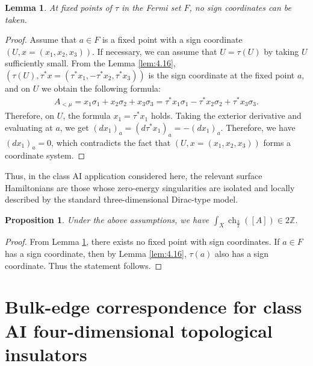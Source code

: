 \documentclass{amsart}
\newtheorem{prop}[thm]{Proposition}
\newtheorem{lem}[thm]{Lemma}
\theoremstyle{definition}
\theoremstyle{remark}
\begin{document}
\begin{lem}\label{lem:4.17}
At fixed points of $\tau$ in the Fermi set $F$, no sign coordinates can be taken.
\end{lem}

\begin{proof}
Assume that $a \in F$ is a fixed point with a sign coordinate $(U, x=(x_1, x_2, x_3))$. If necessary, we can assume that $U=\tau(U)$ by taking $U$ sufficiently small.
From the Lemma \ref{lem:4.16}, $(\tau(U), \tau^{*}x=(\tau^{*}x_1, -\tau^{*}x_2, \tau^{*}x_3))$ is the sign coordinate at the fixed point $a$, and on $U$ we obtain the following formula:
\begin{align*}
A_{<\mu}=x_1\sigma_1+x_2\sigma_2+x_3\sigma_3=\tau^{*}x_1\sigma_1-\tau^{*}x_2\sigma_2+\tau^{*}x_3\sigma_3.
\end{align*}
Therefore, on $U$, the formula $x_1=\tau^{*}x_1$ holds. Taking the exterior derivative and evaluating at $a$, we get $(dx_1)_a=(d\tau^{*}x_1)_a=-(dx_1)_a$. Therefore, we have $(dx_1)_a=0$, which contradicts the fact that $(U, x=(x_1, x_2, x_3))$ forms a coordinate system.
\end{proof}

Thus, in the class AI application considered here, the relevant surface Hamiltonians are those whose zero-energy singularities are isolated and locally described by the standard three-dimensional Dirac-type model.

\begin{prop}\label{prop:evenness}
Under the above assumptions, we have $\int_{X} \operatorname{ch}_{\frac{3}{2}}([A]) \in 2\mathbb{Z}$.
\end{prop}

\begin{proof}
From Lemma \ref{lem:4.17}, there exists no fixed point with sign coordinates. If $a \in F$ has a sign coordinate, then by Lemma \ref{lem:4.16}, $\tau(a)$ also has a sign coordinate. Thus the statement follows.
\end{proof}

                                                         

\section{Bulk-edge correspondence for class AI four-dimensional topological insulators}
\label{sec:Bulk-edge correspondence for class AI four-dimensional topological insulators}
\end{document}
